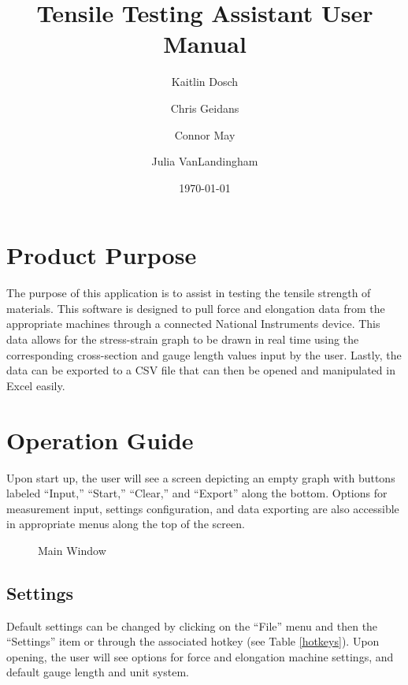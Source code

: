 \documentclass[12pt,letterpaper, USenglish]{article}
\title{Tensile Testing Assistant User Manual}
\author{Kaitlin Dosch \and Chris Geidans \and Connor May \and Julia VanLandingham}
\date{\today}
\theoremstyle{definition}
\numberwithin{theorem}{section}
\numberwithin{lemma}{section}
\numberwithin{corollary}{section}
\numberwithin{definition}{section}
\numberwithin{example}{section}
\numberwithin{equation}{theorem}
\begin{document}
\maketitle

\pagebreak
\tableofcontents
\pagebreak
{}

\pagebreak

\section{Product Purpose}\label{purposeSection}
The purpose of this application is to assist in testing the tensile strength of materials.
This software is designed to pull force and elongation data from the appropriate machines through a connected National Instruments device. This data allows for the stress-strain graph to be drawn in real time using the corresponding cross-section and gauge length values input by the user. Lastly, the data can be exported to a CSV file that can then be opened and manipulated in Excel easily. 

\section{Operation Guide}\label{operationSection}
Upon start up, the user will see a screen depicting an empty graph with buttons labeled ``Input,'' ``Start,'' ``Clear,'' and ``Export'' along the bottom. Options for measurement input, settings configuration, and data exporting are also accessible in appropriate menus along the top of the screen. 

\begin{figure}[H]
    \centering
    \caption{Main Window}
\end{figure}

\subsection{Settings} \label{settingsSection}
Default settings can be changed by clicking on the ``File'' menu and then the ``Settings'' item or through the associated hotkey (see Table \ref{hotkeys}). Upon opening, the user will see options for force and elongation machine settings, and default gauge length and unit system.
\end{document}
